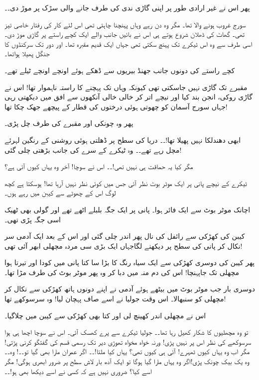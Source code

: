 پھر اس نے غیر ارادی طور پر اپنی گاڑی ندی کی طرف جانے والی سڑک پر موڑ دی۔۔

سورج غروب ہونے والا تھا۔ مگر وہ دن رہے وہاں پہنچنا چاہتی تھی اس لئے کار کی رفتار خاصی تیز تھی۔ گھاٹ کی ڈھلان شروع ہوتے ہی اس نے بائیں جانب والے ایک کچے راستے پر گاڑی موڑ دی۔ اسی طرف سے وہ اس ٹیکرے تک پہنچ سکتی تھی جہاں ایک قدیم مقبرہ تھا۔ اور دور تک سرکنڈوں کا جنگل پھیلا ہواتھا۔

کچے راستے کی دونوں جانب جھنڈ بیریوں سے ڈھکے ہوئے اونچے اونچے ٹیلے تھے۔

مقبرے تک گاڑی نہیں جاسکتی تھی کیونکہ وہاں تک پہچنے کا راستہ ناہموار تھا! اس نے گاڑی روکی، انجن بند کیا اور نیچے اتر کر خالی خالی آنکھوں سے افق میں دیکھتی رہی جہاں سورج آسمان کو چھوتی ہوئی درختوں کی قطار کے پیچھے جھک چکا تھا!

پھر وہ چونکی اور مقبرے کی طرف چل پڑی۔

ابھی دھندلکا نہیں پھیلا تھا!۔۔ دریا کی سطح پر ڈھلتی ہوئی روشنی کے رنگین لہرئے مچل رہے تھے۔۔ وہ ٹیکرے کے سرے کی جانب بڑھتی چلی گئی!

مگر کیا یہ حماقت ہی نہیں تھی!۔۔ اس نے سوچا! آخر وہ یہاں کیوں آئی ہے؟

ٹیکرے کے نیچے پانی پر ایک موٹر بوٹ نظر آئی جس میں کوئی نظر نہیں آرہا تھا! ہوسکتا ہے کچھ لوگ اس کے چھوٹے سے کیبن میں رہے ہوں۔

اچانک موٹر بوٹ سے ایک فائر ہوا۔ پانی پر ایک جگہ بلبلے اٹھے تھے اور گولی بھی ٹھیک اسی جگہ پڑی تھی۔

کیبن کی کھڑکی سے رائفل کی نال پھر اندر چلی گئی اور اس کے بعد ایک آدمی سر نکال کر پانی کی سطح پر دیکھنے لگاجہاں ایک بڑی سی مردہ مچھلی ابھر آئی تھی!

پھر کیبن کی دوسری کھڑکی سے ایک سیاہ رنگ کا بڑا سا کتا پانی میں کودا اور تیرتا ہوا مچھلی تک جاپہنچا! اس کی دم منہ میں دبا کر وہ پھر موٹر بوٹ کی طرف مڑا تھا۔

دوسری بار جب موٹر بوٹ میں بیٹھے ہوئے آدمی نے اپنے دونوں ہاتھ کھڑکی سے نکال کر مچھلی کو سنبھالا۔ اس وقت جولیا نے اسے صاف پہچان لیا! وہ سرسوکھے تھا!

اس نے مچھلی اندر کھینچ لی اور کتا بھی کھڑکی سے کیبن میں چلاگیا۔

تو وہ مچھلیوں کا شکار کھیل رہا تھا۔۔ جولیا ٹیکرے سے پرے کھسک آئی۔ اس نے سوچا اچھا ہی ہوا سرسوکھے کی نظر اس پر نہیں پڑی! ورنہ خواہ مخواہ تھوڑی دیر تک رسمی قسم کی گفتگو کرنی پڑتی! مگر اب وہ یہاں کیوں ٹھہرے! آئی ہی کیوں تھی؟ یہاں کیا ملتا!۔۔ اگر عمران مارا بھی گیا تو۔۔! وہ۔۔ وہ یک بیک چونک پڑی!اگر وہ یہاں مارا گیا ہوگا تو ایک آدھ بار لاش سطح پر ضرور ابھری ہوگی! مگر اسے کیا؟ ضروری نہیں ہے کہ کسی نے اسے دیکھا بھی ہو!۔۔

